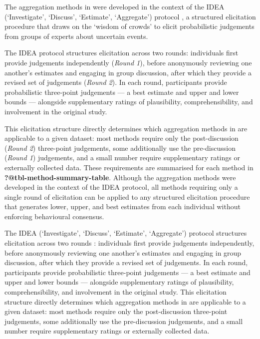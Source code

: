 \documentclass[article]{jss}
\begin{document}
The aggregation methods in  were developed in the context
of the IDEA (`Investigate', `Discuss', `Estimate', `Aggregate') protocol
\citep{hemming2017}, a structured elicitation procedure that draws on
the `wisdom of crowds' to elicit probabilistic judgements from groups of
experts about uncertain events.

The IDEA protocol structures elicitation across two rounds: individuals
first provide judgements independently (\emph{Round 1}), before
anonymously reviewing one another's estimates and engaging in group
discussion, after which they provide a revised set of judgements
(\emph{Round 2}). In each round, participants provide probabilistic
three-point judgements --- a best estimate and upper and lower bounds
--- alongside supplementary ratings of plausibility, comprehensibility,
and involvement in the original study.

This elicitation structure directly determines which aggregation methods
in  are applicable to a given dataset: most methods
require only the post-discussion (\emph{Round 2}) three-point
judgements, some additionally use the pre-discussion (\emph{Round 1})
judgements, and a small number require supplementary ratings or
externally collected data. These requirements are summarised for each
method in \textbf{?@tbl-method-summary-table}. Although the aggregation
methods were developed in the context of the IDEA protocol, all methods
requiring only a single round of elicitation can be applied to any
structured elicitation procedure that generates lower, upper, and best
estimates from each individual without enforcing behavioural consensus.

The IDEA (`Investigate', `Discuss', `Estimate', `Aggregate') protocol
structures elicitation across two rounds \citep{hemming2017}:
individuals first provide judgements independently, before anonymously
reviewing one another's estimates and engaging in group discussion,
after which they provide a revised set of judgements. In each round,
participants provide probabilistic three-point judgements --- a best
estimate and upper and lower bounds --- alongside supplementary ratings
of plausibility, comprehensibility, and involvement in the original
study. This elicitation structure directly determines which aggregation
methods in  are applicable to a given dataset: most
methods require only the post-discussion three-point judgements, some
additionally use the pre-discussion judgements, and a small number
require supplementary ratings or externally collected data.
\end{document}
